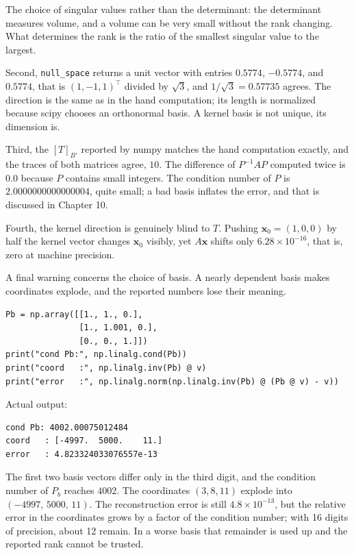 The choice of singular values rather than the determinant: the determinant measures volume, and a volume can be
very
small without the rank changing. What determines the rank is the ratio of the smallest singular value
to the
largest.

Second, \texttt{null\_space} returns a unit vector with entries $0.5774$,
$-0.5774$, and $0.5774$, that is $(1,-1,1)^{\top}$ divided by $\sqrt{3}$, and
$1/\sqrt{3}=0.57735$ agrees. The direction is the same as in the hand computation; its length is normalized
because
scipy chooses an orthonormal basis. A kernel basis is not unique, its dimension is.

Third, the $[T]_{B'}$ reported by numpy matches the hand computation exactly, and the traces
of both matrices agree, $10$. The difference of $P^{-1}AP$ computed twice is $0.0$ because
$P$
contains small integers. The condition number of $P$ is $2.0000000000000004$, quite
small;
a bad basis inflates the error, and that is discussed in Chapter 10.

Fourth, the kernel direction is genuinely blind to $T$. Pushing $\mathbf{x}_{0}=(1,0,0)$ by
half the kernel vector changes $\mathbf{x}_{0}$ visibly, yet $A\mathbf{x}$ shifts only
$6.28\times10^{-16}$, that is, zero at machine precision.

A final warning concerns the choice of basis. A nearly dependent basis makes coordinates
explode, and the reported numbers lose their meaning.

\begin{lab}
\begin{verbatim}
Pb = np.array([[1., 1., 0.],
               [1., 1.001, 0.],
               [0., 0., 1.]])
print("cond Pb:", np.linalg.cond(Pb))
print("coord   :", np.linalg.inv(Pb) @ v)
print("error   :", np.linalg.norm(np.linalg.inv(Pb) @ (Pb @ v) - v))
\end{verbatim}
Actual output:
\begin{verbatim}
cond Pb: 4002.00075012484
coord   : [-4997.  5000.    11.]
error   : 4.823324033076557e-13
\end{verbatim}
\end{lab}

The first two basis vectors differ only in the third digit, and the condition number of $P_{b}$
reaches $4002$. The coordinates $(3,8,11)$ explode into $(-4997,\,5000,\,11)$. The reconstruction
error
is still $4.8\times10^{-13}$, but the relative error in the coordinates grows by a factor of
the
condition number; with 16 digits of precision, about 12 remain. In a worse basis that remainder
is
used up and the reported rank cannot be trusted.

